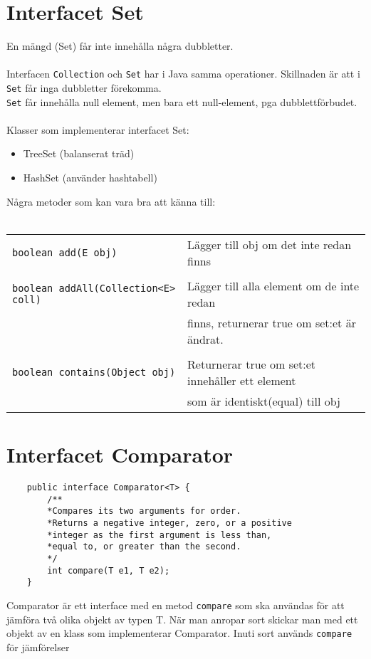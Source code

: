 \documentclass[11pt]{article}
\begin{document}
\section{Interfacet Set}
En mängd (Set) får inte innehålla några dubbletter. \\ \\
Interfacen \verb+Collection+ och \verb+Set+ har i Java samma operationer. Skillnaden är att i \verb+Set+ får inga dubbletter förekomma. \\
\verb+Set+ får innehålla null element, men bara ett null-element, pga dubblettförbudet. \\
\\
Klasser som implementerar interfacet Set:
\begin{itemize}
\item{TreeSet (balanserat träd)}
\item{HashSet (använder hashtabell)}
\end{itemize}
Några metoder som kan vara bra att känna till:\\ \\
\begin{tabular}{l|l}
\hline
	\verb+boolean add(E obj)+	&	Lägger till obj om det inte redan finns \\ \\
	\verb+boolean addAll(Collection<E> coll)+	&	Lägger till alla element om de inte redan \\
	&	finns, returnerar true om set:et är ändrat. \\ \\
	\verb+boolean contains(Object obj)+	&	Returnerar true om set:et innehåller ett element \\
	&	som är identiskt(equal) till obj \\
\hline	
\end{tabular}
\section{Interfacet Comparator}
\begin{lstlisting}
	public interface Comparator<T> {
		/**
		*Compares its two arguments for order.
		*Returns a negative integer, zero, or a positive
		*integer as the first argument is less than,
		*equal to, or greater than the second.
		*/
		int compare(T e1, T e2);
	}
\end{lstlisting}
Comparator är ett interface med en metod \verb+compare+ som ska användas för att jämföra två olika objekt av typen T. När man anropar sort skickar man med ett objekt av en klass som implementerar Comparator. Inuti sort används \verb+compare+ för jämförelser
\end{document}
